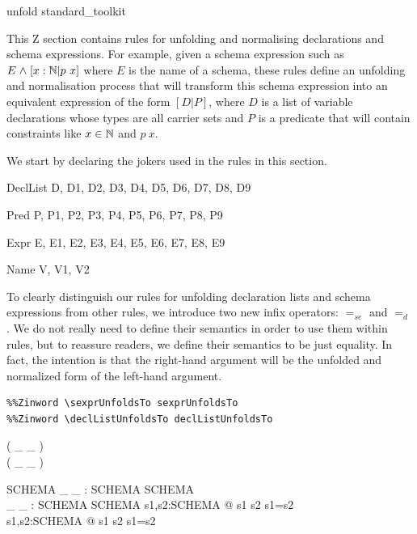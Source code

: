 \documentclass{entcs}
\newcommand{\sexprUnfoldsTo}{\mathrel{=_{se}}}
\newcommand{\declListUnfoldsTo}{\mathrel{=_d}}
\begin{document}
\begin{zsection}
  \SECTION unfold \parents standard\_toolkit
\end{zsection}

This Z section contains rules for unfolding and normalising declarations
and schema expressions.  For example, given a schema expression such as $E
\mathrel{\mathstrut{\wedge}} [x:{\mathbb N} | p~x]$ where $E$ is the name of a schema, these rules define
an unfolding and normalisation process that will transform this schema
expression into an equivalent expression of the form $[D|P]$, where $D$ is
a list of variable declarations whose types are all carrier sets and $P$ is
a predicate that will contain constraints like $x \in {\mathbb N}$ and $p~x$.

We start by declaring the jokers used in the rules in this section.

\begin{zedjoker}{DeclList} D, D1, D2, D3, D4, D5, D6, D7, D8, D9 \end{zedjoker}
\begin{zedjoker}{Pred} P, P1, P2, P3, P4, P5, P6, P7, P8, P9 \end{zedjoker}
\begin{zedjoker}{Expr} E, E1, E2, E3, E4, E5, E6, E7, E8, E9 \end{zedjoker}
\begin{zedjoker}{Name} V, V1, V2 \end{zedjoker}

To clearly distinguish our rules for unfolding declaration lists and
schema expressions from other rules, we introduce two new infix
operators: $\sexprUnfoldsTo$ and $\declListUnfoldsTo$.  
We do not really need to define their semantics in order to use them within
rules, but to reassure readers, we define their semantics to be just
equality.  In fact, the intention is that the right-hand argument
will be the unfolded and normalized form of the left-hand argument.

\begin{verbatim}
%%Zinword \sexprUnfoldsTo sexprUnfoldsTo
%%Zinword \declListUnfoldsTo declListUnfoldsTo
\end{verbatim}
%
\begin{zed}
  \relation ( \_ \sexprUnfoldsTo \_ ) \\
  \relation ( \_ \declListUnfoldsTo \_ )
\end{zed}
%
\begin{gendef}{SCHEMA}
  \_ \sexprUnfoldsTo \_ : SCHEMA \rel SCHEMA \\
  \_ \declListUnfoldsTo \_ : SCHEMA \rel SCHEMA
\where
  \forall s1,s2:SCHEMA @ s1 \sexprUnfoldsTo s2 \iff s1=s2 \\
  \forall s1,s2:SCHEMA @ s1 \declListUnfoldsTo s2 \iff s1=s2 \\
\end{gendef}
\end{document}
